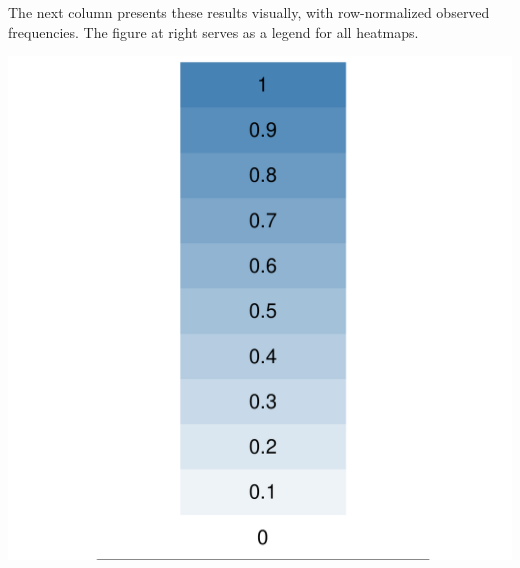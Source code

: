 \documentclass[landscape, paperwidth=42in, paperheight=36in,
fontscale=.35, margin=1in]{baposter}
\begin{document}
\begin{poster}
{  \begin{minipage}{0.45\textwidth}
    The next column presents these results visually, with row-normalized observed frequencies. The figure at right serves as a legend for all heatmaps.
  \end{minipage}
  \hspace{0.05\textwidth}
  \begin{minipage}{0.45\textwidth}
    \begin{center}
      \includegraphics[scale=0.2]{../graphics/scale.pdf}
    \end{center}
  \end{minipage}
 }


\end{poster}
\end{document}
